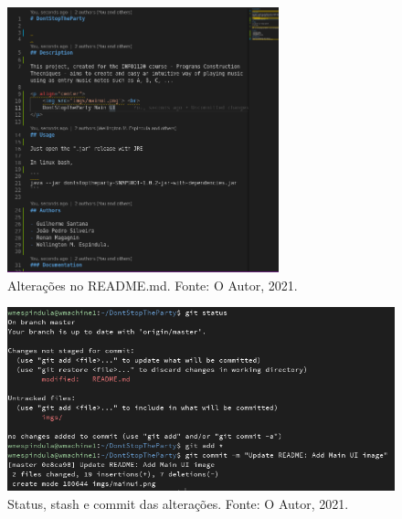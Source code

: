 \documentclass[12pt, a4paper]{article}
\begin{document}
\begin{enumerate}[label=\textbf{\arabic*.}]
{\begin{figure}[!ht]
              \centering
              \includegraphics[width=0.7\textwidth]{1c.png}
                \caption{Alterações no README.md. Fonte: O Autor, 2021.}
              \label{fig:question1b}
          \end{figure}
          \begin{figure}[!ht]
              \centering
              \includegraphics[width=\textwidth]{1b.png}
                \caption{Status, stash e commit das alterações. Fonte: O Autor, 2021.}
              \label{fig:question1c}
          \end{figure}
        } \clearpage
        

\end{enumerate}
\end{document}

